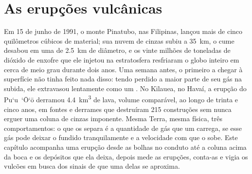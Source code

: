 \chapter{As erupções vulcânicas}\label{ch:b2:eruptive-styles}

Em 15 de junho de 1991, o monte Pinatubo, nas Filipinas, lançou mais de cinco
quilômetros cúbicos de material; sua nuvem de cinzas subiu a
\qty{35}{km}, o cume desabou em uma  de \qty{2.5}{km} de diâmetro, e os
vinte milhões de toneladas de dióxido de enxofre que ele injetou na estratosfera resfriaram o
globo inteiro em cerca de meio grau durante dois anos. Uma semana antes, o primeiro
 a chegar à superfície não tinha feito nada disso: tendo perdido a maior parte de seu
gás na subida, ele extravasou lentamente como um . No Kīlauea, no Havaí, a
erupção do Pu`u~`\=O`\=o derramou \qty{4.4}{km^3} de lava, volume comparável,
ao longo de trinta e cinco anos, em fontes e derrames que destruíram 215 construções
sem nunca erguer uma coluna de cinzas imponente. Mesma Terra, mesma física, três comportamentos: o que
os separa é a quantidade de gás que um  carrega, se esse gás pode deixar o
fundido tranquilamente e a velocidade com que o  sobe. Este capítulo acompanha uma erupção
desde as bolhas no conduto até a coluna acima da boca e os depósitos que ela
deixa, depois mede as erupções, conta-as e vigia os vulcões em busca dos
sinais de que uma delas se aproxima.

